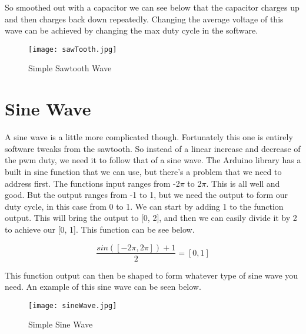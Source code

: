 \documentclass[prb,preprint]{revtex4-1}
\begin{document}
So smoothed out with a capacitor we can see below that the capacitor charges up and then charges back down repeatedly. Changing the average voltage of this wave can be achieved by changing the max duty cycle in the software. 

\begin{figure}[ht]
	\centering
	\texttt{[image: sawTooth.jpg]}
	\caption{Simple Sawtooth Wave}
	\label{fig1}
\end{figure}

\section{Sine Wave}
A sine wave is a little more complicated though. Fortunately this one is entirely software tweaks from the sawtooth. So instead of a linear increase and decrease of the pwm duty, we need it to follow that of a sine wave. The Arduino library has a built in sine function that we can use, but there's a problem that we need to address first. The functions input ranges from -2$\pi$ to 2$\pi$. This is all well and good. But the output ranges from -1 to 1, but we need the output to form our duty cycle, in this case from 0 to 1. We can start by adding 1 to the function output. This will bring the output to [0, 2], and then we can easily divide it by 2 to achieve our [0, 1]. This function can be see below.

\begin{equation}
	\frac{sin([-2\pi, 2\pi])+1}{2} = [0, 1]
\end{equation}

This function output can then be shaped to form whatever type of sine wave you need. An example of this sine wave can be seen below.

\begin{figure}[ht]
	\centering
	\texttt{[image: sineWave.jpg]}
	\caption{Simple Sine Wave}
	\label{fig1}
\end{figure}

\end{document}

